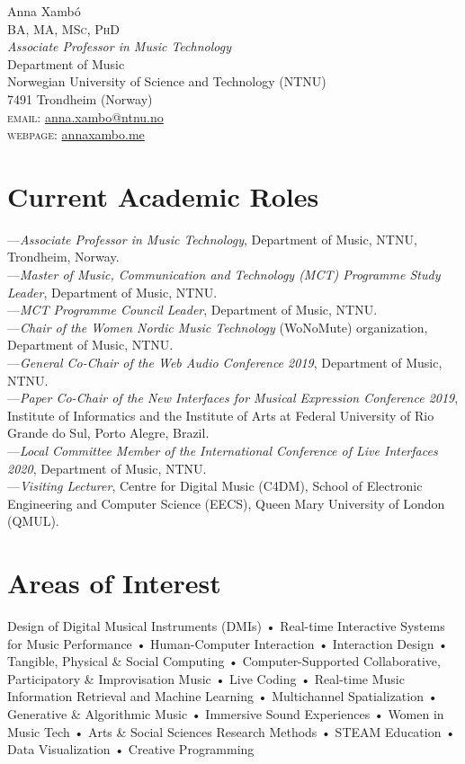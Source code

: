 \documentclass[10pt, a4paper]{article}
\begin{document}
{\Huge Anna Xambó}\\[0.1cm]
\textsc{BA, MA, MSc, PhD}\\[0.9cm]
\emph{Associate Professor in Music Technology}\\
Department of Music\\
Norwegian University of Science and Technology (NTNU)\\
7491 Trondheim (Norway)\\[.2cm]
\textsc{email}: \href{mailto:anna.xambo@ntnu.no}{anna.xambo@ntnu.no}\\
\textsc{webpage}: \href{http://annaxambo.me/}{annaxambo.me}\\ 

\section*{Current Academic Roles}
---\emph{Associate Professor in Music Technology}, Department of Music, NTNU, Trondheim, Norway.\\
---\emph{Master of Music, Communication and Technology (MCT) Programme Study Leader}, Department of Music, NTNU.\\
---\emph{MCT Programme Council Leader}, Department of Music, NTNU.\\
---\emph{Chair of the Women Nordic Music Technology} (WoNoMute) organization, Department of Music, NTNU.\\
---\emph{General Co-Chair of the Web Audio Conference 2019}, Department of Music, NTNU.\\
---\emph{Paper Co-Chair of the New Interfaces for Musical Expression Conference 2019}, Institute of Informatics and the Institute of Arts at Federal University of Rio Grande do Sul, Porto Alegre, Brazil.\\
---\emph{Local Committee Member of the International Conference of Live Interfaces 2020}, Department of Music, NTNU.\\
---\emph{Visiting Lecturer}, Centre for Digital Music (C4DM), School of Electronic Engineering and Computer Science (EECS), Queen Mary University of London (QMUL).\\

\section*{Areas of Interest}
Design of Digital Musical Instruments (DMIs) • Real-time Interactive Systems for Music Performance • Human-Computer Interaction • Interaction Design • Tangible, Physical \& Social Computing • Computer-Supported Collaborative, Participatory \& Improvisation Music • Live Coding • Real-time Music Information Retrieval and Machine Learning • Multichannel Spatialization • Generative \& Algorithmic Music • Immersive Sound Experiences • Women in Music Tech • Arts \& Social Sciences Research Methods • STEAM Education • Data Visualization • Creative Programming
\end{document}
